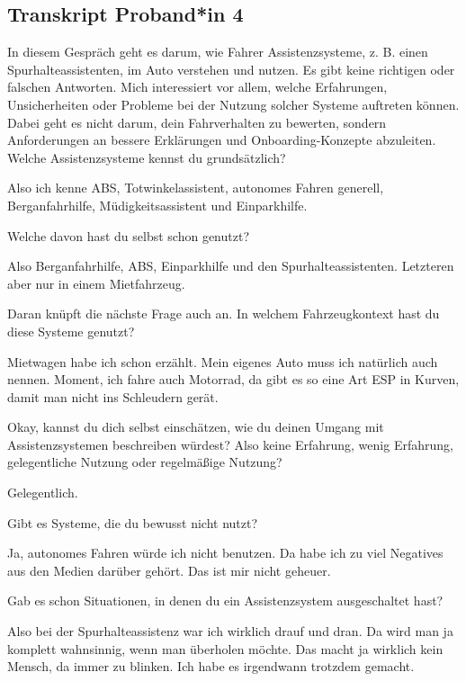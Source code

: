 
\clearpage
\subsection{Transkript Proband*in 4}
\label{subsec:transkript-p4}

\interviewerin
In diesem Gespräch geht es darum, wie Fahrer Assistenzsysteme, z. B.
einen Spurhalteassistenten, im Auto verstehen und nutzen. Es gibt keine
richtigen oder falschen Antworten. Mich interessiert vor allem, welche
Erfahrungen, Unsicherheiten oder Probleme bei der Nutzung solcher
Systeme auftreten können. Dabei geht es nicht darum, dein Fahrverhalten
zu bewerten, sondern Anforderungen an bessere Erklärungen und
Onboarding-Konzepte abzuleiten. Welche Assistenzsysteme kennst du
grundsätzlich?

Also ich kenne ABS, Totwinkelassistent, autonomes Fahren generell,
Berganfahrhilfe, Müdigkeitsassistent und Einparkhilfe.

\interviewerin
Welche davon hast du selbst schon genutzt?

Also Berganfahrhilfe, ABS, Einparkhilfe und den Spurhalteassistenten.
Letzteren aber nur in einem Mietfahrzeug.

\interviewerin
Daran knüpft die nächste Frage auch an. In welchem Fahrzeugkontext hast
du diese Systeme genutzt?

Mietwagen habe ich schon erzählt. Mein eigenes Auto muss ich natürlich
auch nennen. Moment, ich fahre auch Motorrad, da gibt es so eine Art ESP
in Kurven, damit man nicht ins Schleudern gerät.

\interviewerin
Okay, kannst du dich selbst einschätzen, wie du deinen Umgang mit
Assistenzsystemen beschreiben würdest? Also keine Erfahrung, wenig
Erfahrung, gelegentliche Nutzung oder regelmäßige Nutzung?

Gelegentlich.

\interviewerin
Gibt es Systeme, die du bewusst nicht nutzt?

Ja, autonomes Fahren würde ich nicht benutzen. Da habe ich zu viel
Negatives aus den Medien darüber gehört. Das ist mir nicht geheuer.

\interviewerin
Gab es schon Situationen, in denen du ein Assistenzsystem ausgeschaltet
hast?

Also bei der Spurhalteassistenz war ich wirklich drauf und dran. Da
wird man ja komplett wahnsinnig, wenn man überholen möchte. Das macht
ja wirklich kein Mensch, da immer zu blinken. Ich habe es irgendwann
trotzdem gemacht.


